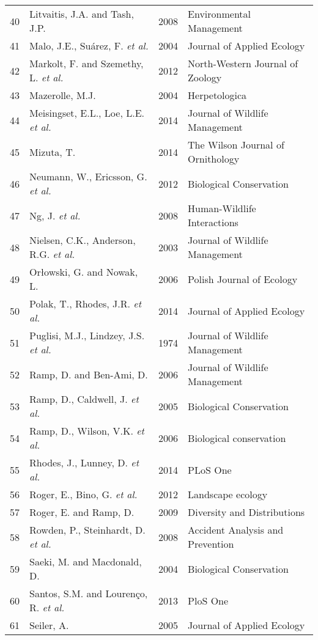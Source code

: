 \begin{longtable}[c]{p{.75cm}p{6cm}p{1.25cm}p{5.5cm}}
   40 & Litvaitis, J.A. and Tash, J.P. & 2008 & Environmental Management \\ 
   41 & Malo, J.E., Suárez, F. \textit{et al.} & 2004 & Journal of Applied Ecology \\ 
   42 & Markolt, F. and Szemethy, L. \textit{et al.} & 2012 & North-Western Journal of Zoology \\ 
   43 & Mazerolle, M.J. & 2004 & Herpetologica \\ 
   44 & Meisingset, E.L., Loe, L.E. \textit{et al.} & 2014 & Journal of Wildlife Management \\ 
   45 & Mizuta, T. & 2014 & The Wilson Journal of Ornithology \\ 
   46 & Neumann, W., Ericsson, G. \textit{et al.} & 2012 & Biological Conservation  \\ 
   47 & Ng, J. \textit{et al.} & 2008 & Human-Wildlife Interactions \\ 
   48 & Nielsen, C.K., Anderson, R.G. \textit{et al.} & 2003 & Journal of Wildlife Management \\ 
   49 & Orłowski, G. and Nowak, L. & 2006 & Polish Journal of Ecology \\ 
   50 & Polak, T., Rhodes, J.R. \textit{et al.} & 2014 & Journal of Applied Ecology \\ 
   51 & Puglisi, M.J., Lindzey, J.S. \textit{et al.} & 1974 & Journal of Wildlife Management \\ 
   52 & Ramp, D. and Ben-Ami, D. & 2006 & Journal of Wildlife Management \\ 
   53 & Ramp, D., Caldwell, J. \textit{et al.} & 2005 & Biological Conservation \\ 
   54 & Ramp, D., Wilson, V.K. \textit{et al.} & 2006 & Biological conservation \\ 
   55 & Rhodes, J., Lunney, D. \textit{et al.} & 2014 & PLoS One \\ 
   56 & Roger, E., Bino, G. \textit{et al.} & 2012 & Landscape ecology \\ 
   57 & Roger, E. and Ramp, D. & 2009 & Diversity and Distributions \\ 
   58 & Rowden, P., Steinhardt, D. \textit{et al.} & 2008 & Accident Analysis and Prevention  \\ 
   59 & Saeki, M. and Macdonald, D. & 2004 & Biological Conservation  \\ 
   60 & Santos, S.M. and Louren{\c{c}}o, R. \textit{et al.} & 2013 & PloS One \\ 
   61 & Seiler, A. & 2005 & Journal of Applied Ecology \\ 

\end{longtable}
